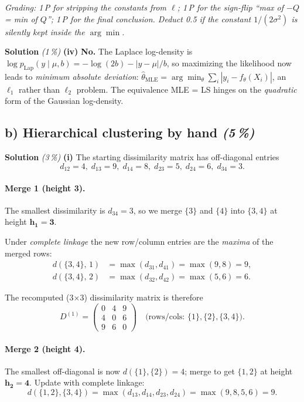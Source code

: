 \documentclass[11pt,a4paper]{article}
\newcommand{\subpoints}[1]{\textit{(#1\,\%)}}
\newcommand{\sol}{\noindent\textbf{Solution}}
\begin{document}
\noindent\emph{Grading: 1\,P for stripping the constants from $\ell$; 1\,P for the sign-flip
``max of $-Q$ = min of $Q$''; 1\,P for the final conclusion. Deduct 0.5 if the constant
$1/(2\sigma^2)$ is silently kept inside the $\arg\min$.}

\medskip
\sol{} \subpoints{1} \textbf{(iv)} \textbf{No.} The Laplace log-density is
$\log p_{\text{Lap}}(y\mid\mu,b)=-\log(2b)-|y-\mu|/b$, so maximizing the likelihood now leads to
\emph{minimum absolute deviation}:
$\hat\theta_{\mathrm{MLE}} = \arg\min_\theta\sum_i|y_i-f_\theta(X_i)|$, an $\ell_1$ rather than
$\ell_2$ problem. The equivalence MLE = LS hinges on the \emph{quadratic} form of the Gaussian
log-density.

\subsection*{b) Hierarchical clustering by hand \subpoints{5}}

\sol{} \subpoints{3} \textbf{(i)} The starting dissimilarity matrix has off-diagonal entries
$$d_{12}=4,\;d_{13}=9,\;d_{14}=8,\;d_{23}=5,\;d_{24}=6,\;d_{34}=3.$$

\paragraph{Merge 1 (height 3).} The smallest dissimilarity is $d_{34}=3$, so we merge
$\{3\}$ and $\{4\}$ into $\{3,4\}$ at height $\mathbf{h_1=3}$.

Under \emph{complete linkage} the new row/column entries are the \emph{maxima} of the merged rows:
\begin{align*}
d(\{3,4\},\,1) &= \max(d_{31},d_{41}) = \max(9,8) = 9, \\
d(\{3,4\},\,2) &= \max(d_{32},d_{42}) = \max(5,6) = 6.
\end{align*}

The recomputed (3$\times$3) dissimilarity matrix is therefore
$$D^{(1)} = \begin{pmatrix}
0 & 4 & 9 \\
4 & 0 & 6 \\
9 & 6 & 0
\end{pmatrix}
\quad\text{(rows/cols: $\{1\},\{2\},\{3,4\}$).}$$

\paragraph{Merge 2 (height 4).} The smallest off-diagonal is now $d(\{1\},\{2\})=4$; merge to get
$\{1,2\}$ at height $\mathbf{h_2=4}$. Update with complete linkage:
$$d(\{1,2\},\{3,4\}) = \max(d_{13},d_{14},d_{23},d_{24}) = \max(9,8,5,6) = 9.$$
\end{document}
